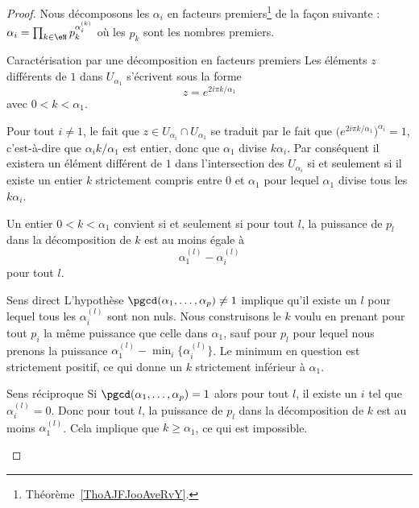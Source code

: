 \begin{proof}
	Nous décomposons les \( \alpha_i\) en facteurs premiers\footnote{Théorème~\ref{ThoAJFJooAveRvY}.} de la façon suivante : \( \alpha_i=\prod_{k\in \eN}p_k^{\alpha_i^{(k)}}\) où les \( p_k\) sont les nombres premiers.

	\begin{subproof}
		\item[Caractérisation par une décomposition en facteurs premiers]
		Les éléments \( z\) différents de \( 1\) dans \( U_{\alpha_1}\) s'écrivent sous la forme
		\begin{equation}
			z= e^{2i\pi k/\alpha_1}
		\end{equation}
		avec \( 0<k<\alpha_1\).

		Pour tout \( i\neq 1\), le fait que \( z\in U_{\alpha_i}\cap U_{\alpha_1}\) se traduit par le fait que \( \big(  e^{2i\pi k/\alpha_1} \big)^{\alpha_i}=1\), c'est-à-dire que \( \alpha_ik/\alpha_1\) est entier, donc que \( \alpha_1\) divise \( k\alpha_i\). Par conséquent il existera un élément différent de \( 1\) dans l'intersection des \( U_{\alpha_i}\) si et seulement si il existe un entier \( k\) strictement compris entre \( 0\) et \( \alpha_1\) pour lequel \( \alpha_1\) divise tous les \( k\alpha_i\).

		Un entier \( 0<k<\alpha_1\) convient si et seulement si pour tout \( l\), la puissance de \( p_l\) dans la décomposition de \( k\) est au moins égale à
		\begin{equation}
			\alpha_1^{(l)}-\alpha_i^{(l)}
		\end{equation}
		pour tout \( l\).
		\item[Sens direct]
		L'hypothèse \( \pgcd(\alpha_1,\ldots, \alpha_p)\neq 1\) implique qu'il existe un \( l\) pour lequel tous les \( \alpha_i^{(l)}\) sont non nuls. Nous construisons le \( k\) voulu en prenant pour tout \( p_i\) la même puissance que celle dans \( \alpha_1\), sauf pour \( p_l\) pour lequel nous prenons la puissance \(  \alpha_1^{(l)}-\min_i\{   \alpha_i^{(l)} \} \). Le minimum en question est strictement positif, ce qui donne un \( k\) strictement inférieur à \( \alpha_1\).
		\item[Sens réciproque]
		Si \( \pgcd(\alpha_1,\ldots, \alpha_p)=1\) alors pour tout \( l\), il existe un \( i\) tel que \( \alpha_i^{(l)}=0\). Donc pour tout \( l\), la puissance de \( p_l\) dans la décomposition de \( k\) est au moins \( \alpha_1^{(l)}\). Cela implique que \( k\geq \alpha_1\), ce qui est impossible.
	\end{subproof}
\end{proof}

